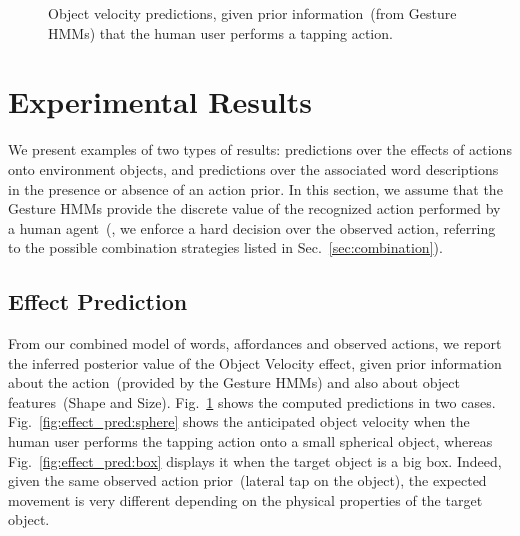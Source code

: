 
\begin{figure}
    \centering
     \quad
    \caption{Object velocity predictions, given prior information~(from Gesture \acp{HMM}) that the human user performs a tapping action.}
    \label{fig:effect_pred}
\end{figure}

\section{Experimental Results}

We present examples of two types of results: predictions over the effects of actions onto environment objects, and predictions over the associated word descriptions in the presence or absence of an action prior. In this section, we assume that the Gesture \acp{HMM} provide the discrete value of the recognized action performed by a human agent~(\ie, we enforce a hard decision over the observed action, referring to the possible combination strategies listed in Sec.~\ref{sec:combination}).

\subsection{Effect Prediction}

From our combined model of words, affordances and observed actions, we report the inferred posterior value of the Object Velocity effect, given prior information about the action~(provided by the Gesture \acp{HMM}) and also about object features~(Shape and Size). Fig.~\ref{fig:effect_pred} shows the computed predictions in two cases. Fig.~\ref{fig:effect_pred:sphere} shows the anticipated object velocity when the human user performs the tapping action onto a small spherical object, whereas Fig.~\ref{fig:effect_pred:box} displays it when the target object is a big box. Indeed, given the same observed action prior~(lateral tap on the object), the expected movement is very different depending on the physical properties of the target object.

